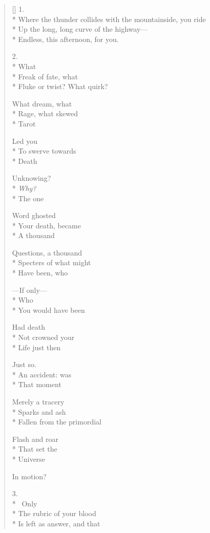 \label{ch:siderius_nuncius}
\settowidth{\versewidth}{Where the thunder collides with the mountainside, you ride}
\begin{verse}[\versewidth]
1.\\*
Where the thunder collides with the mountainside, you ride\\*
Up the long, long curve of the highway---\\*
Endless, this afternoon, for you.

2.\\*
What\\*
Freak of fate, what\\*
Fluke or twist? What quirk?

What dream, what\\*
Rage, what skewed\\*
Tarot

Led you\\*
To swerve towards\\*
Death

Unknowing?\\*
\textit{Why?}\\*
The one

Word ghosted\\*
Your death, became\\*
A thousand

Questions, a thousand\\*
Specters of what might\\*
Have been, who

---If only---\\*
Who\\*
You would have been

Had death\\*
Not crowned your\\*
Life just then

Just so.\\*
An accident: was\\*
That moment

Merely a tracery\\*
Sparks and ash\\*
Fallen from the primordial

Flash and roar\\*
That set the\\*
Universe

In motion?

3.\\*
\hspace{4\vgap} Only\\*
The rubric of your blood\\*
Is left as answer, and that


\end{verse}
